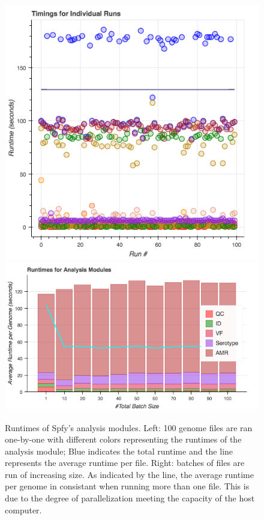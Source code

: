 \documentclass{article}
\begin{document}
\begin{figure}[!htb]
  \includegraphics[width=\linewidth]{images/spfy_indivs.png}
\endminipage\hfill
{}%
  \includegraphics[width=\linewidth]{images/spfy_batches.png}
\endminipage
\caption{Runtimes of Spfy's analysis modules. Left: 100 genome files are ran one-by-one with different colors representing the runtimes of the analysis module; Blue indicates the total runtime and the line represents the average runtime per file. Right: batches of files are run of increasing size. As indicated by the line, the average runtime per genome in consistant when running more than one file. This is due to the degree of parallelization meeting the capacity of the host computer.}\label{fig:spfy_performance}
\end{figure}
\end{document}
